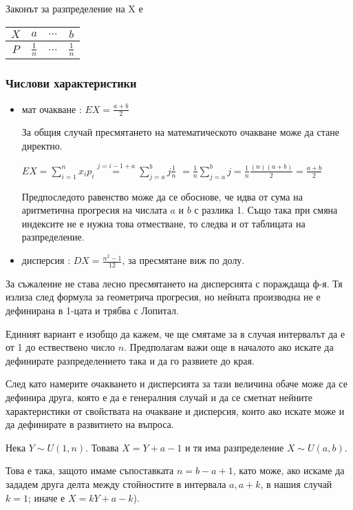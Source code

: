 \documentclass[fleqn,12pt]{article}
\begin{document}
\begin{justify}
Законът за разпределение на X е
\begin{tabular}{|c|c|c|c|}
    \hline
    $X$ & $a$ & $\dots$ & $b$ \\
    \hline
    $P$ & $\frac{1}{n}$ & $\dots$ & $\frac{1}{n}$ \\
    \hline
\end{tabular}

\subsubsection{Числови характеристики} 
\begin{itemize}
    \item мат очакване : $EX = \frac{a+b}{2}$
    
    За общия случай пресмятането на математическото очакване може да стане директно.

    $EX = \sum_{i=1}^n x_ip_i \overset{j=i-1+a}{=} \sum_{j=a}^b j \frac{1}{n}$
    $= \frac{1}{n} \sum_{j=a}^b j = \frac{1}{n} \frac{(n)(a+b)}{2} = \frac{a+b}{2}$

    Предпоследото равенство може да се обоснове, че идва от сума на аритметична прогресия на числата $a$ и $b$ с разлика
    1. Също така при смяна индексите не е нужна това отместване, то следва и от таблицата на разпределение.

    \item дисперсия : $DX = \frac{n^2 - 1}{12}$, за пресмятане виж по долу.
\end{itemize}

За съжаление не става лесно пресмятането на дисперсията с пораждаща ф-я. Тя излиза след формула за геометрича прогресия,
но нейната производна не е дефинирана в 1-цата и трябва с Лопитал. 

Единият вариант е изобщо да кажем, че ще смятаме за в случая интервалът да е от 1 до ествествено число $n$. Предполагам
важи още в началото ако искате да дефинирате разпределението така и да го развиете до края. 

След като намерите очакването и дисперсията за тази величина обаче може да се дефинира друга, която е да е генералния
случай и да се сметнат нейните характеристики от свойствата на очакване и дисперсия, които ако искате може и да
дефинирате в развитието на въпроса.

Нека $Y \sim U(1, n)$. Товава $X = Y + a - 1$ и тя има разпределение $X \sim U(a, b)$.

Това е така, защото имаме съпоставката $n = b - a + 1$, като може, ако искаме  да зададем друга делта между стойностите
в интервала $a, a+k$, в нашия случай $k=1$; иначе е $X = kY + a - k$).


\end{justify}
\end{document}
